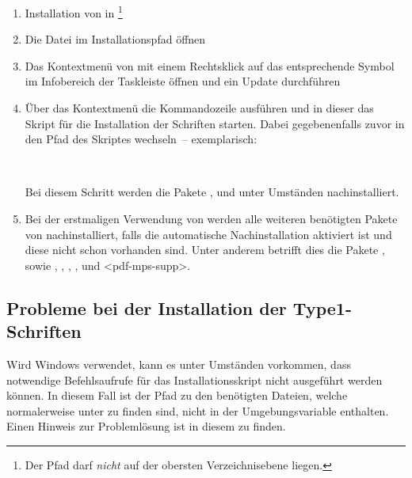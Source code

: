 \begin{enumerate}
\item Installation von  in 
  \footnote{Der Pfad darf \emph{nicht} auf der obersten Verzeichnisebene 
   liegen.
  }
\item Die Datei  im Installationspfad öffnen
\item Das Kontextmenü von  mit einem 
  Rechtsklick auf das entsprechende Symbol im Infobereich der Taskleiste öffnen 
  und ein Update durchführen
\item Über das Kontextmenü die Kommandozeile ausführen und in dieser das Skript 
  für die Installation der Schriften  starten.
  Dabei gegebenenfalls zuvor in den Pfad des Skriptes wechseln~-- exemplarisch:
  \begin{quoting}[leftmargin=1.5em,rightmargin=0pt]
  \newline
  \,
  \end{quoting}
  Bei diesem Schritt werden die Pakete ,  
  und  unter Umständen nachinstalliert.
\item Bei der erstmaligen Verwendung von \TUDScript werden alle weiteren 
  benötigten Pakete von  
  nachinstalliert, falls die automatische Nachinstallation aktiviert ist und 
  diese nicht schon vorhanden sind. Unter anderem betrifft dies die Pakete 
  ,  sowie , 
   , , 
  ,  und <pdf-mps-supp>.  
\end{enumerate}


\subsection{Probleme bei der Installation der Type1-Schriften}
%
Wird Windows verwendet, kann es unter Umständen vorkommen, dass notwendige 
Befehlsaufrufe für das Installationsskript nicht ausgeführt werden können. In 
diesem Fall ist der Pfad zu den benötigten Dateien, welche normalerweise unter 
 zu finden sind, nicht in der 
Umgebungsvariable  enthalten. Einen Hinweis zur Problemlösung ist 
in diesem  zu finden.

